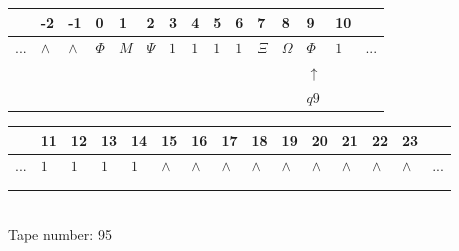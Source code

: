\documentclass[11pt]{article}
\begin{document}
\begin{table}[H]
\centering
\begin{tabular}{lllllllllllllll}
 & -2 & -1 & 0 & 1 & 2 & 3 & 4 & 5 & 6 & 7 & 8 & 9 & 10 & \\
\hline
$...$ & \multicolumn{1}{|l|}{$\wedge$} & \multicolumn{1}{|l|}{$\wedge$} & \multicolumn{1}{|l|}{$\Phi$} & \multicolumn{1}{|l|}{$M$} & \multicolumn{1}{|l|}{$\Psi$} & \multicolumn{1}{|l|}{$1$} & \multicolumn{1}{|l|}{$1$} & \multicolumn{1}{|l|}{$1$} & \multicolumn{1}{|l|}{$1$} & \multicolumn{1}{|l|}{$\Xi$} & \multicolumn{1}{|l|}{$\Omega$} & \multicolumn{1}{|l|}{$\Phi$} & \multicolumn{1}{|l|}{$1$} & $...$\\
\hline
&  &  &  &  &  &  &  &  &  &  &  & $\uparrow$ &  &  \\
&  &  &  &  &  &  &  &  &  &  &  & $ q9 $ &  &  \\
\end{tabular}
\begin{tabular}{lllllllllllllll}
 & 11 & 12 & 13 & 14 & 15 & 16 & 17 & 18 & 19 & 20 & 21 & 22 & 23 & \\
\hline
$...$ & \multicolumn{1}{|l|}{$1$} & \multicolumn{1}{|l|}{$1$} & \multicolumn{1}{|l|}{$1$} & \multicolumn{1}{|l|}{$1$} & \multicolumn{1}{|l|}{$\wedge$} & \multicolumn{1}{|l|}{$\wedge$} & \multicolumn{1}{|l|}{$\wedge$} & \multicolumn{1}{|l|}{$\wedge$} & \multicolumn{1}{|l|}{$\wedge$} & \multicolumn{1}{|l|}{$\wedge$} & \multicolumn{1}{|l|}{$\wedge$} & \multicolumn{1}{|l|}{$\wedge$} & \multicolumn{1}{|l|}{$\wedge$} & $...$\\
\hline
&  &  &  &  &  &  &  &  &  &  &  &  &  &  \\
&  &  &  &  &  &  &  &  &  &  &  &  &  &  \\
\end{tabular}
\\
Tape number: 95
\noindent\makebox[\linewidth]{\hdashrule{\textwidth}{1pt}{1pt}}\end{table}
\clearpage
\end{document}
